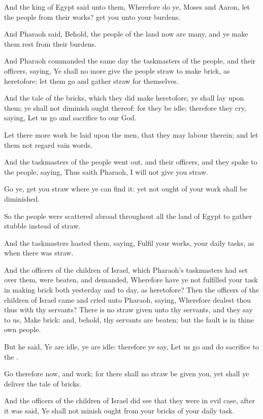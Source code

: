 \Verse And the king of Egypt said unto them, Wherefore do ye, Moses and Aaron, let the people from their works? get you unto your burdens.

\Verse And Pharaoh said, Behold, the people of the land now are many, and ye make them rest from their burdens.

\Verse And Pharaoh commanded the same day the taskmasters of the people, and their officers, saying, \Verse Ye shall no more give the people straw to make brick, as heretofore: let them go and gather straw for themselves.

\Verse And the tale of the bricks, which they did make heretofore, ye shall lay upon them; ye shall not diminish ought thereof: for they be idle; therefore they cry, saying, Let us go and sacrifice to our God.

\Verse Let there more work be laid upon the men, that they may labour therein; and let them not regard vain words.

\Verse And the taskmasters of the people went out, and their officers, and they spake to the people, saying, Thus saith Pharaoh, I will not give you straw.

\Verse Go ye, get you straw where ye can find it: yet not ought of your work shall be diminished.

\Verse So the people were scattered abroad throughout all the land of Egypt to gather stubble instead of straw.

\Verse And the taskmasters hasted them, saying, Fulfil your works, your daily tasks, as when there was straw.

\Verse And the officers of the children of Israel, which Pharaoh's taskmasters had set over them, were beaten, and demanded, Wherefore have ye not fulfilled your task in making brick both yesterday and to day, as heretofore?  \Verse Then the officers of the children of Israel came and cried unto Pharaoh, saying, Wherefore dealest thou thus with thy servants?  \Verse There is no straw given unto thy servants, and they say to us, Make brick: and, behold, thy servants are beaten; but the fault is in thine own people.

\Verse But he said, Ye are idle, ye are idle: therefore ye say, Let us go and do sacrifice to the \LORD.

\Verse Go therefore now, and work; for there shall no straw be given you, yet shall ye deliver the tale of bricks.

\Verse And the officers of the children of Israel did see that they were in evil case, after it was said, Ye shall not minish ought from your bricks of your daily task.

